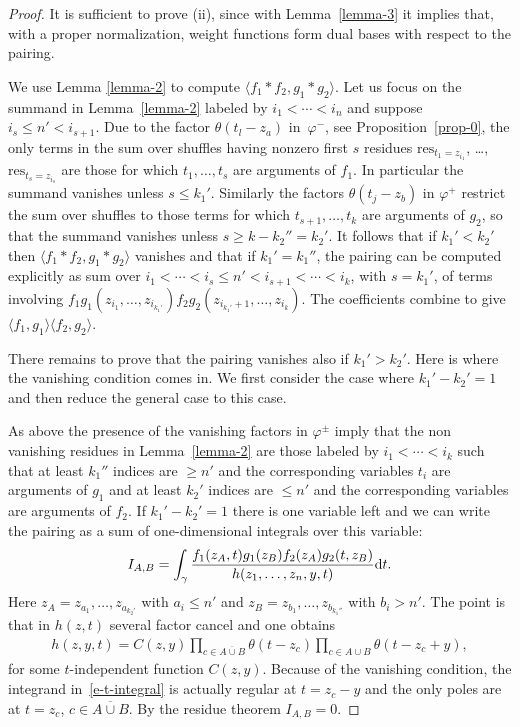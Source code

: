 \documentclass[pdftex]{sigma}
\numberwithin{equation}{section}
\begin{document}
\begin{proof} It is sufficient to prove (ii), since with Lemma~\ref{lemma-3} it implies that, with a proper normalization, weight functions form dual bases with respect to the pairing.

We use Lemma \ref{lemma-2} to compute $\langle f_1*f_2,g_1*g_2\rangle$. Let us focus on the summand in Lemma~\ref{lemma-2} labeled by $i_1<\cdots<i_n$ and suppose $i_s\leq n'<i_{s+1}$. Due to the factor $\theta(t_l-z_a)$ in~$\varphi^-$, see Proposition~\ref{prop-0}, the only terms in the sum over shuffles having nonzero first $s$ residues $\mathrm{res}_{t_1=z_{i_1}}$, \dots, $\mathrm{res}_{t_s=z_{i_s}}$ are those for which $t_1,\dots, t_s$ are arguments of $f_1$. In particular the summand vanishes unless $s\leq k_1'$. Similarly the factors $\theta(t_j-z_b)$ in $\varphi^+$ restrict the sum over shuffles to those terms for which $t_{s+1},\dots,t_k$ are arguments of $g_2$, so that the summand vanishes unless $s\geq k-k_2''=k_2'$. It follows that if $k_1'<k_2'$ then $\langle f_1*f_2,g_1*g_2\rangle$ vanishes and that if $k_1'=k_1''$, the pairing can be computed explicitly as sum over $i_1<\cdots<i_s\leq n'<i_{s+1}<\cdots<i_{k}$, with $s=k_1'$, of terms involving $f_1g_1(z_{i_1},\dots,z_{i_{k_1'}})f_2g_2(z_{i_{k_1'}+1},\dots,z_{i_k})$. The coefficients combine to give $\langle f_1,g_1\rangle\langle f_2,g_2\rangle$.

There remains to prove that the pairing vanishes also if $k_1'>k_2'$. Here is where the vanishing condition comes in. We first consider the case where $k_1'-k_2'=1$ and then reduce the general case to this case.

As above the presence of the vanishing factors in $\varphi^\pm$ imply that the non vanishing residues in Lemma~\ref{lemma-2} are those labeled by $i_1<\cdots<i_k$ such that at least $k_1''$ indices are $\geq n'$ and the corresponding variables $t_i$ are arguments of $g_1$ and at least $k_2'$ indices are $\leq n'$ and the corresponding variables are arguments of $f_2$. If $k_1'-k_2'=1$ there is one variable left and we can write the pairing as a sum of one-dimensional integrals over this variable:
 \begin{gather}\label{e-t-integral}
 I_{A,B}=\int_\gamma \frac{f_1(z_A,t)g_1(z_B)f_2(z_A)g_2(t,z_B)}{h(z_1,\dots,z_n,y,t)}{\rm d}t.
 \end{gather}
Here $z_A=z_{a_1},\dots,z_{a_{k_2'}}$ with $a_i\leq n'$ and $z_B=z_{b_1},\dots,z_{b_{k_1''}}$ with $b_i>n'$. The point is that in $h(z,t)$ several factor cancel and one obtains
\begin{gather*}
 h(z,y,t)=C(z,y)\prod_{c\in \overline {A\cup B}}\theta(t-z_c) \prod_{c\in A\cup B}\theta(t-z_c+y),
 \end{gather*}
for some $t$-independent function $C(z,y)$. Because of the vanishing condition, the integrand in~\eqref{e-t-integral} is actually regular at $t=z_c-y$ and the only poles are at $t=z_c$, $c\in\overline {A\cup B}$. By the residue theorem $I_{A,B}=0$.


\end{proof}
\end{document}
